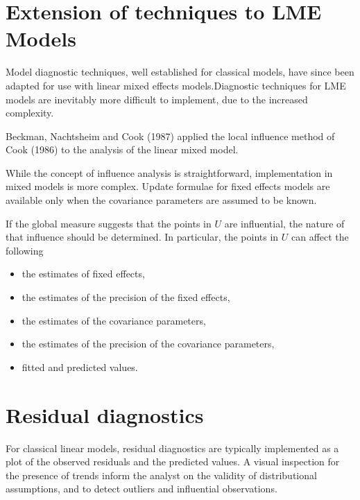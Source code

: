 \documentclass[12pt, a4paper]{report}
\theoremstyle{plain}
\theoremstyle{definition}
\theoremstyle{remark}
\begin{document}
\newpage
\section{Extension of techniques to LME Models} %

Model diagnostic techniques, well established for classical models, have since been adapted for use with linear mixed effects models.Diagnostic techniques for LME models are inevitably more difficult to implement, due to the increased complexity.

Beckman, Nachtsheim and Cook (1987) \citet{Beckman} applied the local influence method of Cook (1986) to the analysis of the linear mixed model.

While the concept of influence analysis is straightforward, implementation in mixed models is more complex. Update formulae for fixed effects models are available only when the covariance parameters are assumed to be known.

If the global measure suggests that the points in $U$ are influential, the nature of that influence should be determined. In particular, the points in $U$ can affect the following

\begin{itemize}
\item the estimates of fixed effects,
\item the estimates of the precision of the fixed effects,
\item the estimates of the covariance parameters,
\item the estimates of the precision of the covariance parameters,
\item fitted and predicted values.
\end{itemize}


\newpage
\section{Residual diagnostics} %
For classical linear models, residual diagnostics are typically implemented as a plot of the observed residuals and the predicted values. A visual inspection for the presence of trends inform the analyst on the validity of distributional assumptions, and to detect outliers and influential observations.



	
\end{document}
